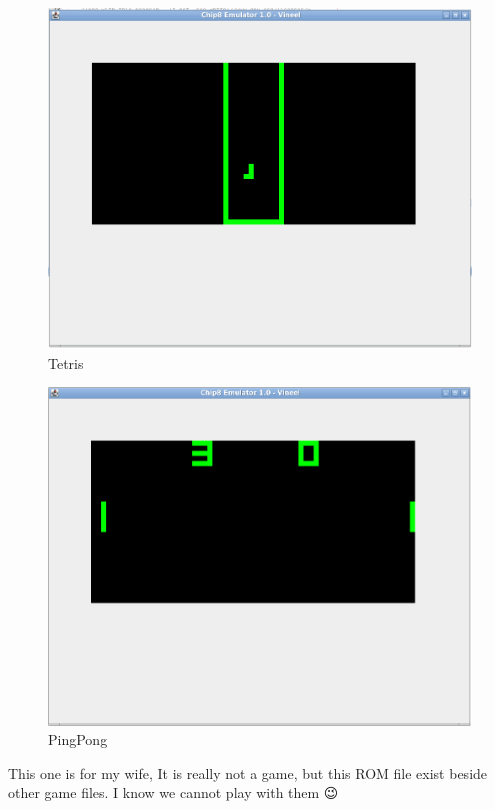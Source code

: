\documentclass{article}
\begin{document}
\begin{figure}[H]
\centering
\includegraphics[width=\textwidth]{4.Emulator.png}
\caption{Tetris}
\end{figure}
\begin{figure}[H]
\centering
\includegraphics[width=\textwidth]{5.Emulator.png}
\caption{PingPong}
\end{figure}
This one is for my wife, It is really not a game, but this ROM file exist beside other game files. I know we cannot play with them 😉
\end{document}
